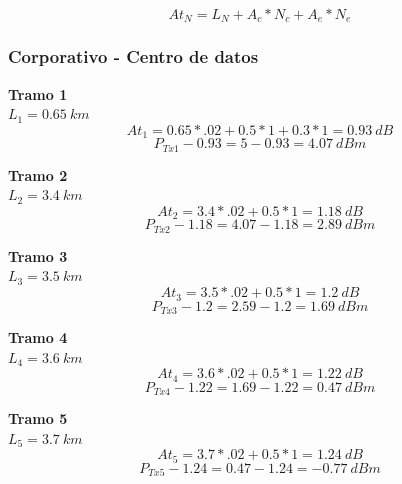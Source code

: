 \documentclass[12pt,letterpaper]{article}
\begin{document}
\begin{equation}
    At_N=L_N+A_c*N_c+A_e*N_e
\end{equation}

\subsubsection{Corporativo - Centro de datos}
\textbf{Tramo 1} \\
$L_1=0.65 \ km$
\\
\begin{equation}
    At_1=0.65*.02+0.5*1+0.3*1=0.93 \ dB
\end{equation}
\begin{equation}
    P_{Tx1}-0.93=5-0.93=4.07 \ dBm
\end{equation}

\textbf{Tramo 2} \\
$L_2=3.4 \ km$
\\
\begin{equation}
    At_2=3.4*.02+0.5*1=1.18 \ dB
\end{equation}
\begin{equation}
    P_{Tx2}-1.18=4.07-1.18=2.89 \ dBm
\end{equation}

\textbf{Tramo 3} \\
$L_3=3.5 \ km$
\\ 
\begin{equation}
    At_3=3.5*.02+0.5*1=1.2 \ dB
\end{equation}
\begin{equation}
    P_{Tx3}-1.2=2.59-1.2=1.69 \ dBm
\end{equation}

\textbf{Tramo 4} \\
$L_4=3.6 \ km$
\\ 
\begin{equation}
    At_4=3.6*.02+0.5*1=1.22 \ dB
\end{equation}
\begin{equation}
    P_{Tx4}-1.22=1.69-1.22=0.47 \ dBm
\end{equation}

\textbf{Tramo 5} \\
$L_5=3.7 \ km$
\\
\begin{equation}
    At_5=3.7*.02+0.5*1=1.24 \ dB
\end{equation}
\begin{equation}
    P_{Tx5}-1.24=0.47-1.24=-0.77 \ dBm
\end{equation}
\end{document}
